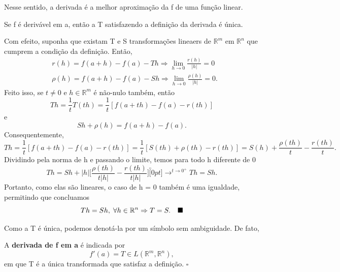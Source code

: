 \documentclass[../analysisII_notes.tex]{subfiles}
\begin{document}
Nesse sentido, a derivada é a melhor aproximação da f de uma função linear.
\begin{theorem*}
	Se f é derivável em a, então a T satisfazendo a definição da derivada é única.
\end{theorem*}
\begin{proof*}
	Com efeito, suponha que existam T e S transformações lineaers de \(\mathbb{R}^{m}\) em \(\mathbb{R}^{n}\) que cumprem a condição da definição. Então,
	\begin{align*}
		 & r(h) = f(a+h) - f(a) - Th \Rightarrow \lim_{h\to 0}\frac{r(h)}{|h|} = 0         \\
		 & \rho(h) = f(a+h) - f(a) - Sh \Rightarrow \lim_{h\to 0}\frac{\rho (h)}{|h|} = 0.
	\end{align*}
	Feito isso, se \(t\neq 0\) e \(h\in \mathbb{R}^{m}\) é não-nulo também, então
	\[
		Th = \frac{1}{t}T(th) = \frac{1}{t}[f(a+th) - f(a) - r(th)]
	\]
	e
	\[
		Sh + \rho (h) = f(a+h) - f(a).
	\]
	Consequentemente,
	\[
		Th = \frac{1}{t}[f(a+th) - f(a) - r(th)] = \frac{1}{t}[S(th) + \rho (th) - r(th)] = S(h) + \frac{\rho (th)}{t}-\frac{r(th)}{t}.
	\]
	Dividindo pela norma de h e passando o limite, temos para todo h diferente de 0
	\[
		Th = Sh + |h|\biggl[\frac{\rho (th)}{t|h|} - \frac{r(th)}{t|h|}\biggr]\overbracket[0pt]{\longrightarrow}^{t\to 0^{+}} Th = Sh.
	\]
	Portanto, como elas são lineares, o caso de h = 0 também é uma igualdade, permitindo que concluamos
	\[
		Th = Sh,\; \forall h\in \mathbb{R}^{n} \Rightarrow T = S. \quad \text{$\blacksquare$}
	\]
\end{proof*}
Como a T é única, podemos denotá-la por um símbolo sem ambiguidade. De fato,
\begin{def*}
	A \textbf{derivada de f em a} é indicada por
	\[
		f'(a) = T\in L(\mathbb{R}^{m}, \mathbb{R}^{n}),
	\]
	em que T é a única transformada que satisfaz a definição. \(\square\)
\end{def*}
\end{document}
